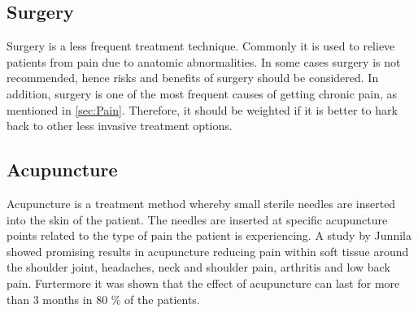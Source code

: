 \subsection{Surgery}
Surgery is a less frequent treatment technique. Commonly it is used to relieve patients from pain due to anatomic abnormalities. \cite{marcus2009,pope2017} In some cases surgery is not recommended, hence risks and benefits of surgery should be considered. In addition, surgery is one of the most frequent causes of getting chronic pain, as mentioned in \autoref{sec:Pain}. Therefore, it should be weighted if it is better to hark back to other less invasive treatment options. \cite{pope2017}


\subsection{Acupuncture}
Acupuncture is a treatment method whereby small sterile needles are inserted into the skin of the patient. The needles are inserted at specific acupuncture points related to the type of pain the patient is experiencing. \cite{Dhanani2011} A study by Junnila \cite{Junnilla1983} showed promising results in acupuncture reducing pain within soft tissue around the shoulder joint, headaches, neck and shoulder pain, arthritis and low back pain.  Furtermore it was shown that the effect of acupuncture can last for more than 3 months in 80 \% of the patients. \cite{Junnilla1983} 


